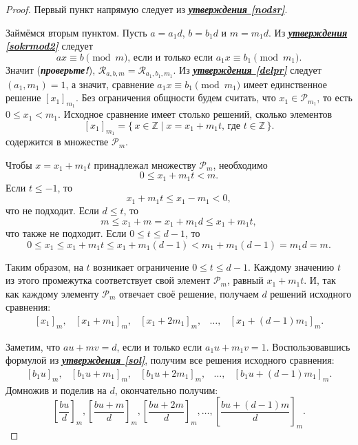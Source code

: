 \documentclass[14pt, a4paper]{extarticle}
\theoremstyle{definition}
\begin{document}
	\begin{proof}
		Первый пункт напрямую следует из \hyperref[nodsr]{\textbf{\textit{утверждения \ref*{nodsr}}}}.
		
		Займёмся вторым пунктом. Пусть $a=a_1d$, $b=b_1d$ и $m=m_1d$. Из \hyperref[sokrmod2]{\textbf{\textit{утверждения \ref*{sokrmod2}}}} следует
		$$\boxed{ax\equiv b\pmod{m}\text{, если и только если }a_1x\equiv b_1\pmod{m_1}}.$$
		Значит (\textbf{\textit{проверьте!}}), $\mathcal{R}_{a,b,m}=\mathcal{R}_{a_1,b_1,m_1}$. Из \hyperref[delpr]{\textbf{\textit{утверждения \ref*{delpr}}}} следует $(a_1,m_1)=1$, а значит, сравнение $a_1x\equiv b_1\pmod{m_1}$ имеет единственное решение $[x_1]_{m_1}$. Без ограничения общности будем считать, что $x_1\in\mathcal{P}_{m_1}$, то есть $0\leqslant x_1<m_1$. Исходное сравнение имеет столько решений, сколько элементов
		$$[x_1]_{m_1}=\{\,x\in\mathbb{Z}\mid x=x_1+m_1t\text{, где }t\in\mathbb{Z}\,\}.$$
		содержится в множестве $\mathcal{P}_m$.
		
		Чтобы $x=x_1+m_1t$ принадлежал множеству $\mathcal{P}_m$, необходимо $$0\leqslant x_1+m_1t<m.$$ Если $t\leqslant-1$, то $$x_1+m_1t\leqslant x_1-m_1<0,$$ что не подходит. Если $d\leqslant t$, то $$m\leqslant x_1+m=x_1+m_1d\leqslant x_1+m_1t,$$ что также не подходит. Если $0\leqslant t\leqslant d-1$, то
		$$\boxed{0\leqslant}x_1\leqslant\boxed{x_1+m_1t}\leqslant x_1+m_1(d-1)\boxed{<}m_1+m_1(d-1)=m_1d=\boxed{m}.$$
		
		Таким образом, на $t$ возникает ограничение $0\leqslant t\leqslant d-1$. Каждому значению $t$ из этого промежутка соответствует свой элемент $\mathcal{P}_m$, равный $x_1+m_1t$. И, так как каждому элементу $\mathcal{P}_m$ отвечает своё решение, получаем $d$ решений исходного сравнения:
		$$\begin{array}{ccccc}
			[x_1]_m,&[x_1+m_1]_m,&[x_1+2m_1]_m,&\dots,&[x_1+(d-1)m_1]_m.
		\end{array}$$
		
		Заметим, что $au+mv=d$, если и только если \mbox{$a_1u+m_1v=1$}. Воспользовавшись формулой из \hyperref[sol]{\textbf{\textit{утверждения \ref*{sol}}}}, получим все решения исходного сравнения:
		$$\begin{array}{ccccc}
			[b_1u]_m,&[b_1u+m_1]_m,&[b_1u+2m_1]_m,&\dots,&[b_1u+(d-1)m_1]_m.
		\end{array}$$
		Домножив и поделив на $d$, окончательно получим:
		$$\left[\frac{bu}{d}\right]_m, \left[\frac{bu+m}{d}\right]_m, \left[\frac{bu+2m}{d}\right]_m, \dots, \left[\frac{bu+(d-1)m}{d}\right]_m.$$
	\end{proof}
\end{document}
